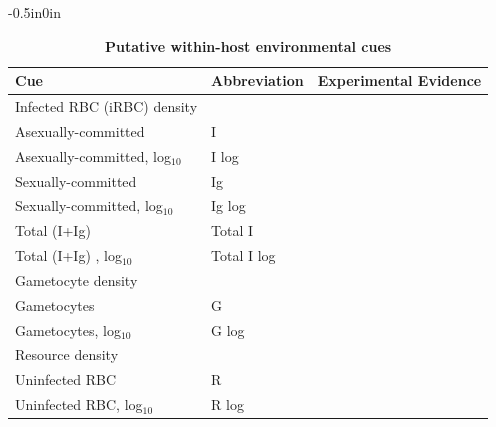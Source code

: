 \documentclass[10pt,letterpaper]{article}
\begin{document}
\begin{table}[!ht]

\begin{adjustwidth}{-0.5in}{0in} %
\centering
\centering\captionsetup{width=0.75\linewidth}
\caption{{\bf Putative within-host environmental cues}}
\begin{tabular}{lll}
\toprule
Cue & Abbreviation & Experimental Evidence \\
\midrule
Infected RBC (iRBC) density && \cite{mantel_malaria-infected_2013,cameron_plasticity_2013, birget_phenotypic_2017, schneider_adaptive_2018}\\
\phantom{XXX} Asexually-committed & I & \\
\phantom{XXX} Asexually-committed, log$_{10}$ & I log & \\
\phantom{XXX} Sexually-committed & Ig & \\
\phantom{XXX} Sexually-committed, log$_{10}$ & Ig log & \\
\phantom{XXX} Total (I+Ig) & Total I & \\
\phantom{XXX} Total (I+Ig) , log$_{10}$ & Total I log & \\
Gametocyte density & &\cite{mantel_malaria-infected_2013,cameron_plasticity_2013, birget_phenotypic_2017}\\
\phantom{XXX}Gametocytes&G&\\
\phantom{XXX}Gametocytes, log$_{10}$ & G log & \\
Resource density & & \cite{cameron_plasticity_2013,birget_phenotypic_2017, schneider_adaptive_2018}\\
\phantom{XXX} Uninfected RBC & R & \\
\phantom{XXX} Uninfected RBC, log$_{10}$ & R log\\ 
\bottomrule
\end{tabular}
\label{table1}
\end{adjustwidth}
\end{table}
\end{document}
